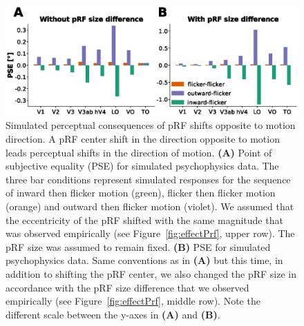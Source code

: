 \begin{figure}[htbp!]
\centering
\includegraphics[width=\textwidth]{figures/chapter_04/fig4b.eps}
\caption{Simulated perceptual consequences of pRF shifts opposite to motion direction. A pRF center shift in the direction opposite to motion leads perceptual shifts in the direction of motion.
\textbf{(A)} Point of subjective equality (PSE) for simulated psychophysics data. The three bar conditions represent simulated responses for the sequence of inward then flicker motion (green), flicker then flicker motion (orange) and outward then flicker motion (violet). We assumed that the eccentricity of the pRF shifted with the same magnitude that was observed empirically (see Figure~\ref{fig:effectPrf}, upper row). The pRF size was assumed to remain fixed.
\textbf{(B)} PSE for simulated psychophysics data. Same conventions as in \textbf{(A)} but this time, in addition to shifting the pRF center, we also changed the pRF size in accordance with the pRF size difference that we observed empirically (see Figure~\ref{fig:effectPrf}, middle row). Note the different scale between the y-axes in \textbf{(A)} and \textbf{(B)}.}
\label{fig:modelOv_simShift}
\end{figure}


